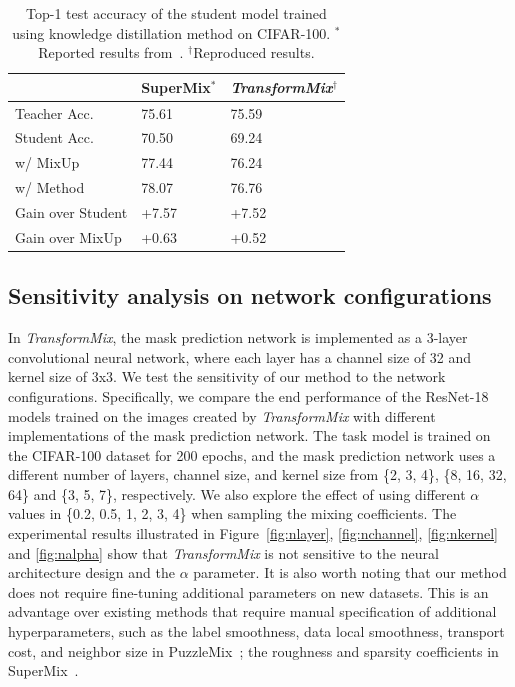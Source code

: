 \documentclass[10pt]{article} %
\newcommand{\TMIX}[0]{\textit{TransformMix }}
\newcommand{\TMIXb}[0]{\textit{TransformMix}}
\begin{document}
\begin{table}[h]
  \caption{Top-1 test accuracy of the student model trained using knowledge distillation method on CIFAR-100. $^{*}$Reported results from~\citep{supermix}. $^{\dagger}$Reproduced results. }
  \label{tab:kd}
  \centering
  \begin{tabularx}{\linewidth}{lYY}
    \toprule
     & SuperMix$^*$ & \TMIXb$^{\dagger}$ \\
    \midrule
    Teacher Acc. 	& 75.61	& 75.59 \\
    Student Acc.	 	& 70.50	& 69.24 \\
    w/ MixUp 		& 77.44	& 76.24 \\
    w/ Method		& 78.07	& 76.76 \\
    \midrule
    Gain over Student & +7.57 & +7.52 \\                       
    Gain over MixUp & +0.63 & +0.52 \\
    \bottomrule
  \end{tabularx}
\end{table}

\subsection{Sensitivity analysis on network configurations}
In \TMIXb, the mask prediction network is implemented as a 3-layer convolutional neural network, where each layer has a channel size of 32 and kernel size of 3x3. We test the sensitivity of our method to the network configurations. Specifically, we compare the end performance of the ResNet-18 models trained on the images created by \TMIX with different implementations of the mask prediction network. The task model is trained on the CIFAR-100 dataset for 200 epochs, and the mask prediction network uses a different number of layers, channel size, and kernel size from \{2, 3, 4\}, \{8, 16, 32, 64\} and \{3, 5, 7\}, respectively. We also explore the effect of using different $\alpha$ values in \{0.2, 0.5, 1, 2, 3, 4\} when sampling the mixing coefficients. The experimental results illustrated in Figure~\ref{fig:nlayer}, \ref{fig:nchannel}, \ref{fig:nkernel} and \ref{fig:nalpha} show that \TMIX is not sensitive to the neural architecture design and the $\alpha$ parameter. It is also worth noting that our method does not require fine-tuning additional parameters on new datasets. This is an advantage over existing methods that require manual specification of additional hyperparameters, such as the label smoothness, data local smoothness, transport cost, and neighbor size in PuzzleMix~\cite{puzzlemix}; the roughness and sparsity coefficients in SuperMix~\cite{supermix}.
\end{document}
